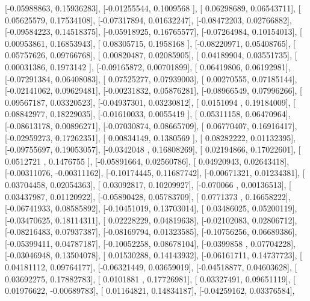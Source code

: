 \documentclass{article}
\begin{document}
       [-0.05988863,  0.15936283],
       [-0.01255544,  0.1009568 ],
       [ 0.06298689,  0.06543711],
       [ 0.05625579,  0.17534108],
       [-0.07317894,  0.01632247],
       [-0.08472203,  0.02766882],
       [-0.09584223,  0.14518375],
       [-0.05918925,  0.16765577],
       [-0.07264984,  0.10154013],
       [ 0.00953861,  0.16853943],
       [ 0.08305715,  0.1958168 ],
       [-0.08220971,  0.05408765],
       [ 0.05757626,  0.09766768],
       [ 0.00820487,  0.02085905],
       [ 0.04189904,  0.03551735],
       [ 0.00031386,  0.1973142 ],
       [-0.09165872,  0.00701899],
       [ 0.06419806,  0.06192981],
       [-0.07291384,  0.06408083],
       [ 0.07525277,  0.07939003],
       [ 0.00270555,  0.07185144],
       [-0.02141062,  0.09629481],
       [-0.00231832,  0.05876281],
       [-0.08966549,  0.07996266],
       [ 0.09567187,  0.03320523],
       [-0.04937301,  0.03230812],
       [ 0.0151094 ,  0.19184009],
       [ 0.08842977,  0.18229035],
       [-0.01610033,  0.0055419 ],
       [ 0.05311158,  0.06470964],
       [-0.08613178,  0.00896271],
       [-0.07030874,  0.08665709],
       [ 0.06770407,  0.16916417],
       [-0.02959273,  0.17262351],
       [ 0.00834149,  0.1380569 ],
       [ 0.08282222,  0.01132395],
       [-0.09755697,  0.19053057],
       [-0.0342048 ,  0.16808269],
       [ 0.02194866,  0.17022601],
       [ 0.0512721 ,  0.1476755 ],
       [-0.05891664,  0.02560786],
       [ 0.04920943,  0.02643418],
       [-0.00311076, -0.00311162],
       [-0.10174445,  0.11687742],
       [-0.00671321,  0.01234381],
       [ 0.03704458,  0.02054363],
       [ 0.03092817,  0.10209927],
       [-0.070066  ,  0.00136513],
       [ 0.03437987,  0.01120922],
       [-0.05890428,  0.05783709],
       [ 0.0771373 ,  0.16658222],
       [-0.06741933,  0.08585892],
       [-0.10451019,  0.13703014],
       [ 0.03486025,  0.05200119],
       [-0.03470625,  0.18114311],
       [ 0.02228229,  0.04819638],
       [-0.02102083,  0.02806712],
       [-0.08216483,  0.07937387],
       [-0.08169794,  0.01323585],
       [-0.10756256,  0.06689386],
       [-0.05399411,  0.04787187],
       [-0.10052258,  0.08678104],
       [-0.0399858 ,  0.07704228],
       [-0.03046948,  0.13504078],
       [ 0.01530288,  0.14143932],
       [-0.06161711,  0.14737723],
       [ 0.04181112,  0.09764177],
       [-0.06321449,  0.03659019],
       [-0.04518877,  0.04603628],
       [ 0.03692275,  0.17882783],
       [ 0.0101881 ,  0.17726981],
       [ 0.03327491,  0.09651119],
       [ 0.01976622, -0.00689783],
       [ 0.01164821,  0.14834187],
       [-0.04259162,  0.03376584],
\end{document}
